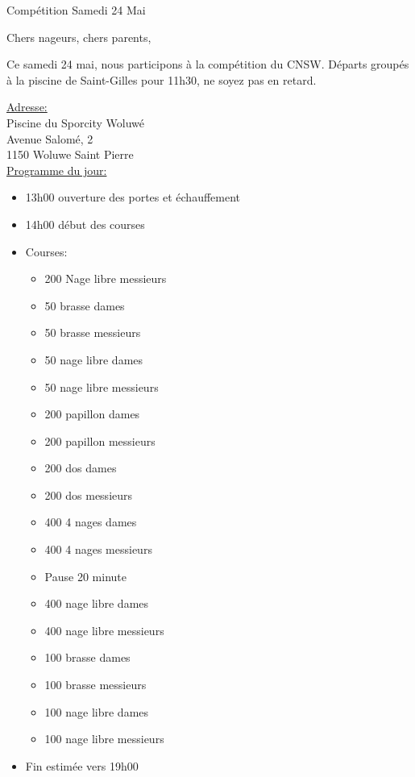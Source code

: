 \documentclass{article}
\begin{document}
\begin{center}\huge{Compétition Samedi 24 Mai}\end{center}
\hspace{1cm}

Chers nageurs, chers parents,

Ce samedi 24 mai, nous participons à la compétition du CNSW.
Départs groupés à la piscine de Saint-Gilles pour 11h30, ne soyez pas en retard.

\vspace{0.5cm}

\underline{Adresse:}\\
Piscine du Sporcity Woluwé\\
Avenue Salomé, 2\\
1150 Woluwe Saint Pierre\\

\underline{Programme du jour:}
\begin{itemize}
\item 13h00 ouverture des portes et échauffement
\item 14h00 début des courses
\item Courses:
\begin{itemize}
\item 200 Nage libre messieurs
\item 50 brasse dames
\item 50 brasse messieurs
\item 50 nage libre dames
\item 50 nage libre messieurs
\item 200 papillon dames
\item 200 papillon messieurs
\item 200 dos dames
\item 200 dos messieurs
\item 400 4 nages dames
\item 400 4 nages messieurs
\item Pause 20 minute
\item 400 nage libre dames
\item 400 nage libre messieurs
\item 100 brasse dames
\item 100 brasse messieurs
\item 100 nage libre dames
\item 100 nage libre messieurs
\end{itemize}
\item Fin estimée vers 19h00
\end{itemize}
\end{document}
